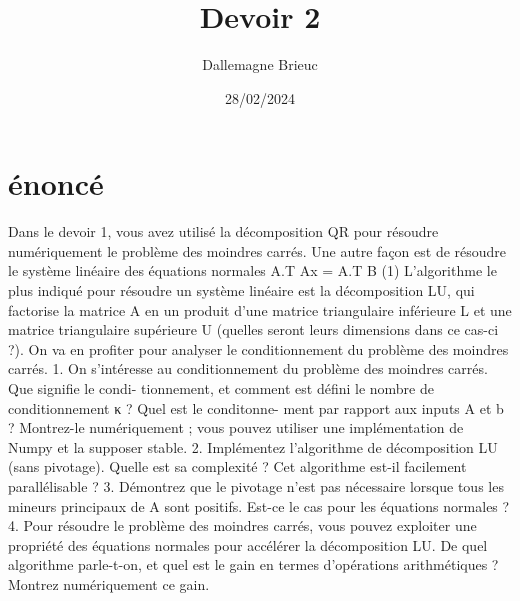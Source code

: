 \documentclass[12pt]{article}
\title{Devoir 2}
\author{Dallemagne Brieuc}
\date{28/02/2024}
\begin{document}
\section{énoncé}
Dans le devoir 1, vous avez utilisé la décomposition QR pour résoudre numériquement le problème
des moindres carrés. Une autre façon est de résoudre le système linéaire des équations normales
A.T Ax = A.T B (1)
L’algorithme le plus indiqué pour résoudre un système linéaire est la décomposition LU, qui factorise
la matrice A en un produit d’une matrice triangulaire inférieure L et une matrice triangulaire
supérieure U (quelles seront leurs dimensions dans ce cas-ci ?). On va en profiter pour analyser le
conditionnement du problème des moindres carrés.
1. On s’intéresse au conditionnement du problème des moindres carrés. Que signifie le condi-
tionnement, et comment est défini le nombre de conditionnement κ ? Quel est le conditonne-
ment par rapport aux inputs A et b ? Montrez-le numériquement ; vous pouvez utiliser une
implémentation de Numpy et la supposer stable.
2. Implémentez l’algorithme de décomposition LU (sans pivotage). Quelle est sa complexité ?
Cet algorithme est-il facilement parallélisable ?
3. Démontrez que le pivotage n’est pas nécessaire lorsque tous les mineurs principaux de A
sont positifs. Est-ce le cas pour les équations normales ?
4. Pour résoudre le problème des moindres carrés, vous pouvez exploiter une propriété des
équations normales pour accélérer la décomposition LU. De quel algorithme parle-t-on, et
quel est le gain en termes d’opérations arithmétiques ? Montrez numériquement ce gain.
\end{document}
